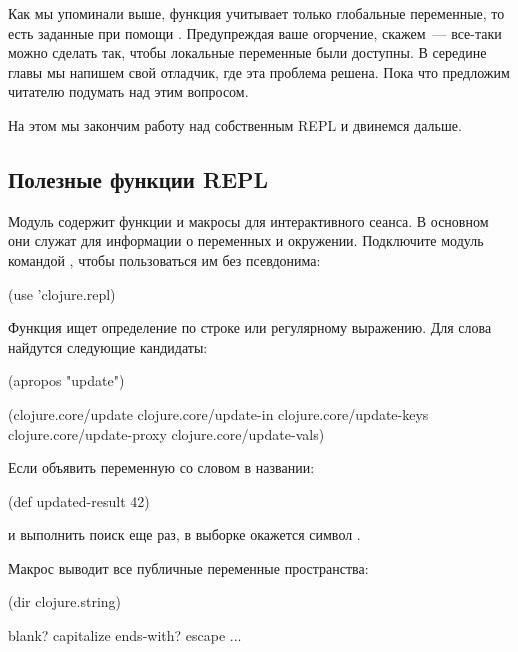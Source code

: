 Как мы упоминали выше, функция  учитывает только глобальные переменные, то есть заданные при помощи . Предупреждая ваше огорчение, скажем~--- все-таки можно сделать так, чтобы локальные переменные были доступны. В середине главы мы напишем свой отладчик, где эта проблема решена. Пока что предложим читателю подумать над этим вопросом.

На этом мы закончим работу над собственным REPL и двинемся дальше.

\subsection{Полезные функции REPL}

Модуль  содержит функции и макросы для интерактивного сеанса. В основном они служат для информации о переменных и окружении. Подключите модуль командой , чтобы пользоваться им без псевдонима:

\begin{english}
  \begin{clojure}
(use 'clojure.repl)
  \end{clojure}
\end{english}

Функция  ищет определение по строке или регулярному выражению. Для слова  найдутся следующие кандидаты:

\begin{english}
  \begin{clojure}
(apropos "update")

(clojure.core/update
 clojure.core/update-in
 clojure.core/update-keys
 clojure.core/update-proxy
 clojure.core/update-vals)
  \end{clojure}
\end{english}

Если объявить переменную со словом  в названии:

\begin{english}
  \begin{clojure}
(def updated-result 42)
  \end{clojure}
\end{english}

\noindent
и выполнить поиск еще раз, в выборке окажется символ .

Макрос  выводит все публичные переменные пространства:

\begin{english}
  \begin{clojure}
(dir clojure.string)

blank?
capitalize
ends-with?
escape
...
  \end{clojure}
\end{english}

